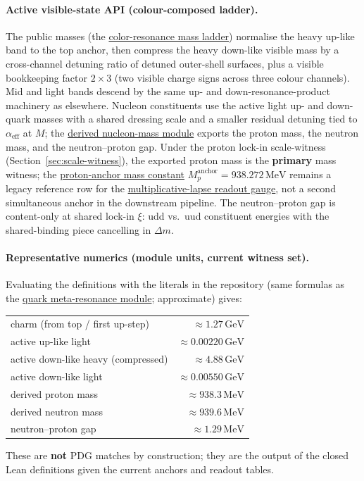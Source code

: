 \documentclass[11pt]{article}
\begin{document}
\paragraph{Active visible-state API (colour-composed ladder).}
The public masses (the
\hyperref[lean:color-resonance]{color-resonance mass ladder})
normalise the heavy up-like band to the top anchor, then
compress the heavy down-like visible mass by a cross-channel
detuning ratio of detuned outer-shell surfaces, plus a visible
bookkeeping factor $2\times 3$ (two visible charge signs across
three colour channels). Mid and light bands descend by the same
up- and down-resonance-product machinery as elsewhere. Nucleon
constituents use the active light up- and down-quark masses
with a shared dressing scale and a smaller residual detuning
tied to $\alpha_{\mathrm{eff}}$ at $M$; the
\hyperref[lean:derived-nucleons]{derived nucleon-mass module}
exports the proton mass, the neutron mass, and the
neutron--proton gap. Under the proton lock-in scale-witness
(Section~\ref{sec:scale-witness}), the exported proton mass is
the \textbf{primary} mass witness; the
\hyperref[lean:proton-anchor]{proton-anchor mass constant}
\(M_p^{\mathrm{anchor}}=938.272\,\mathrm{MeV}\) remains a
legacy reference row for the
\hyperref[lean:lapse-readout]{multiplicative-lapse readout
gauge}, not a second simultaneous anchor in the downstream
pipeline. The neutron--proton gap is content-only at shared
lock-in $\xi$: udd vs.\ uud constituent energies with the
shared-binding piece cancelling in $\Delta m$.

\paragraph{Representative numerics (module units, current witness set).}
Evaluating the definitions with the literals in the repository
(same formulas as the
\hyperref[lean:quark-meta]{quark meta-resonance module};
approximate) gives:
\begin{center}
\begin{tabular}{l r}
  charm (from top / first up-step) & $\approx 1.27\,\mathrm{GeV}$ \\
  active up-like light             & $\approx 0.00220\,\mathrm{GeV}$ \\
  active down-like heavy (compressed) & $\approx 4.88\,\mathrm{GeV}$ \\
  active down-like light           & $\approx 0.00550\,\mathrm{GeV}$ \\
  derived proton mass              & $\approx 938.3\,\mathrm{MeV}$ \\
  derived neutron mass             & $\approx 939.6\,\mathrm{MeV}$ \\
  neutron--proton gap              & $\approx 1.29\,\mathrm{MeV}$
\end{tabular}
\end{center}
These are \textbf{not} PDG matches by construction; they are
the output of the closed Lean definitions given the current
anchors and readout tables.
\end{document}
